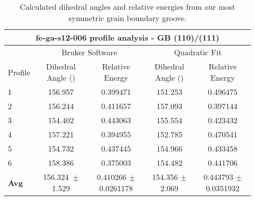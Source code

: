 \begin{table}[h!]
	\centering
	\caption{Calculated dihedral angles and relative energies from our most symmetric grain boundary groove.}
	\begin{tabular} { |p{1cm}||c|c|c|c|  } 
		\hline
		\multicolumn{5}{|c|}{fe-ga-s12-006 profile analysis - GB (110)/(111)}\\
		\hline
		~	&\multicolumn{2}{|c|}{Bruker Software}		&\multicolumn{2}{|c|}{Quadratic Fit}	\\
		\hline
		Profile	&Dihedral Angle (\degree)	&Relative Energy	&Dihedral Angle (\degree)	&Relative Energy \\ 
		\hline
		1		&156.957	&0.399471	&151.253	&0.496475	\\
		\hline
		2		&156.244	&0.411657	&157.093	&0.397144	\\
		\hline
		3		&154.402	&0.443063	&155.554	&0.423432	\\
		\hline
		4		&157.221	&0.394955	&152.785	&0.470541	\\
		\hline
		5		&154.732	&0.437445	&154.966	&0.433458	\\
		\hline
		6		&158.386	&0.375003	&154.482	&0.441706	\\
		\hline
		\textbf{Avg}	&156.324~$\pm$1.529	&0.410266 $\pm$0.0261178	&154.356 $\pm$2.069	&0.443793 $\pm$0.0351932\\
		\hline
	\end{tabular}
	\label{groove-analysis}
\end{table}

%
